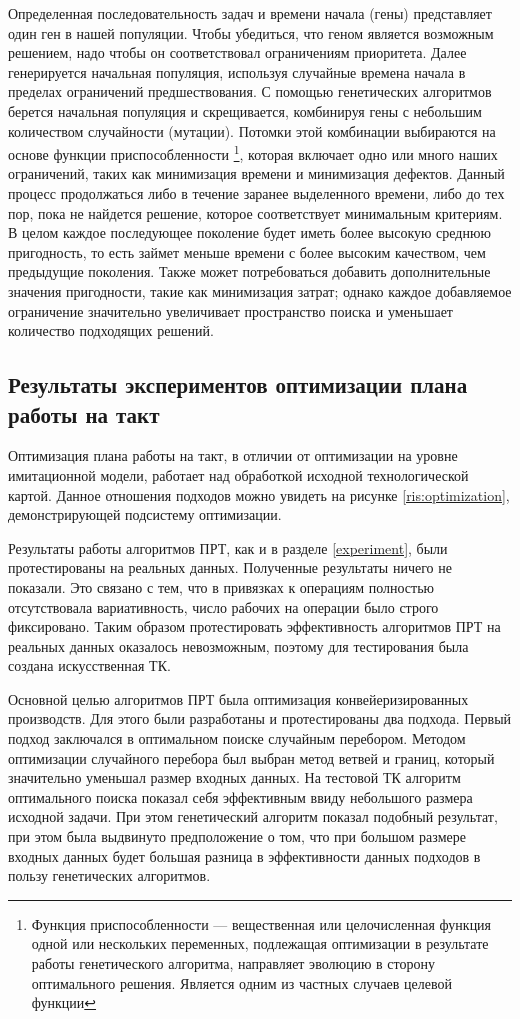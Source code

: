 Определенная последовательность задач и времени начала (гены) представляет один ген в нашей популяции. Чтобы убедиться, что геном является возможным решением, надо чтобы он соответствовал ограничениям приоритета. Далее генерируется начальная популяция, используя случайные времена начала в пределах ограничений предшествования. С помощью генетических алгоритмов берется начальная популяция и скрещивается, комбинируя гены с небольшим количеством случайности (мутации). Потомки этой комбинации выбираются на основе функции приспособленности \footnote{Функция приспособленности — вещественная или целочисленная функция одной или нескольких переменных, подлежащая оптимизации в результате работы генетического алгоритма, направляет эволюцию в сторону оптимального решения. Является одним из частных случаев целевой функции}, которая включает одно или много наших ограничений, таких как минимизация времени и минимизация дефектов. Данный процесс продолжаться либо в течение заранее выделенного времени, либо до тех пор, пока не найдется решение, которое соответствует минимальным критериям. В целом каждое последующее поколение будет иметь более высокую среднюю пригодность, то есть займет меньше времени с более высоким качеством, чем предыдущие поколения. Также может потребоваться добавить дополнительные значения пригодности, такие как минимизация затрат; однако каждое добавляемое ограничение значительно увеличивает пространство поиска и уменьшает количество подходящих решений.

\subsection{Результаты экспериментов оптимизации плана работы на такт}
Оптимизация плана работы на такт, в отличии от оптимизации на уровне имитационной модели, работает над обработкой исходной технологической картой. Данное отношения подходов можно увидеть на рисунке \ref{ris:optimization}, демонстрирующей подсистему оптимизации. 

Результаты работы алгоритмов ПРТ, как и в разделе \ref{experiment}, были протестированы на реальных данных. 
Полученные результаты ничего не показали. Это связано с тем, что в привязках к операциям полностью отсутствовала вариативность, число рабочих на операции было строго фиксировано. Таким образом протестировать эффективность алгоритмов ПРТ на реальных данных оказалось невозможным, поэтому для тестирования была создана искусственная ТК.

Основной целью алгоритмов ПРТ была оптимизация конвейеризированных производств. Для этого были разработаны и протестированы два подхода. 
Первый подход заключался в оптимальном поиске случайным перебором. Методом оптимизации случайного перебора был выбран метод ветвей и границ, который значительно уменьшал размер входных данных.
На тестовой ТК алгоритм оптимального поиска показал себя эффективным ввиду небольшого размера исходной задачи.
При этом генетический алгоритм показал подобный результат, при этом была выдвинуто предположение о том, что при большом размере входных данных будет большая разница в эффективности данных подходов в пользу генетических алгоритмов.

